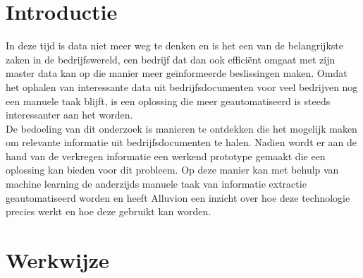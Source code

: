 \documentclass[a0,portrait]{hogent-poster}
\begin{document}
\begin{multicols}{2} %

\section{Introductie}

In deze tijd is data niet meer weg te denken en is het een van de belangrijkste zaken in de bedrijfswereld, een bedrijf dat dan ook efficiënt omgaat met zijn master data kan op die manier meer geïnformeerde beslissingen maken. Omdat het ophalen van interessante data uit bedrijfsdocumenten voor veel bedrijven nog een manuele taak blijft, is een oplossing die meer geautomatiseerd is steeds interessanter aan het worden. 
\\
De bedoeling van dit onderzoek is manieren te ontdekken die het mogelijk maken om relevante informatie uit bedrijfsdocumenten te halen. Nadien wordt er aan de hand van de verkregen informatie een werkend prototype gemaakt die een oplossing kan bieden voor dit probleem. Op deze manier kan met behulp van machine learning de anderzijds manuele taak van informatie extractie geautomatiseerd worden en heeft Alluvion een inzicht over hoe deze technologie precies werkt en hoe deze gebruikt kan worden.

\section{Werkwijze}


\end{multicols}
\end{document}
